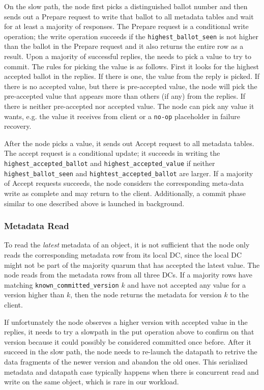 On the slow path, the {\name} node first picks a distinguished ballot number
and then sends out a Prepare request to write that ballot to all metadata
tables and wait for at least a majority of responses. The Prepare request is a conditional
write operation; the write operation succeeds if the {\tt highest\_ballot\_seen} is not higher than 
the ballot in the Prepare request and it also returns the entire row as a result.
Upon a majority of successful replies, the {\name} needs to pick a value to try to commit.
The rules for picking the value is as follows. First it looks for the highest accepted ballot
in the replies. If there is one, the value from the reply is picked. If there is no accepted
value, but there is pre-accepted value, the {\name} node will pick the pre-accepted value
that appears more than others (if any) from the replies. If there is neither pre-accepted
nor accepted value. The {\name} node can pick any value it wants, e.g. the value it receives
from client or a \texttt{no-op} placeholder in failure recovery.

After the {\name} node picks a value, it sends out Accept request to all metadata tables.
The accept request is a conditional update; it succeeds in writing the {\tt
highest\_accepted\_ballot} and {\tt highest\_accepted\_value} if neither {\tt
highest\_ballot\_seen} and {\tt hightest\_accepted\_ballot} are larger.  If a
majority of Accept requests succeeds, the \name node considers the
corresponding meta-data write as complete and may return to the client.
Additionally, a commit phase similar to one described above is launched in
background.

\subsubsection{Metadata Read}

To read the \emph{latest} metadata of an object, it is not sufficient that the \name node 
only reads the corresponding metadata row from its local DC, since the local DC
might not be part of the majority quarum that has accepted the latest value.
The \name node reads from the metadata rows from all three DCs.  If a majority
rows have matching {\tt known\_committed\_version} $k$ and have not accepted
any value for a version higher than $k$, then the \name node returns the
metadata for version $k$ to the client.

If unfortunately the {\name} node observes a higher version with accepted value in the
replies, it needs to try a slowpath in the put operation above to confirm on that version
because it could possibly be considered committed once before. After it succeed in
the slow path, the {\name} node needs to re-launch the datapath to retrive the data
fragments of the newer version and abandon the old ones. This serialized metadata and
datapath case typically happens when there is concurrent read and write on the same
object, which is rare in our workload.

